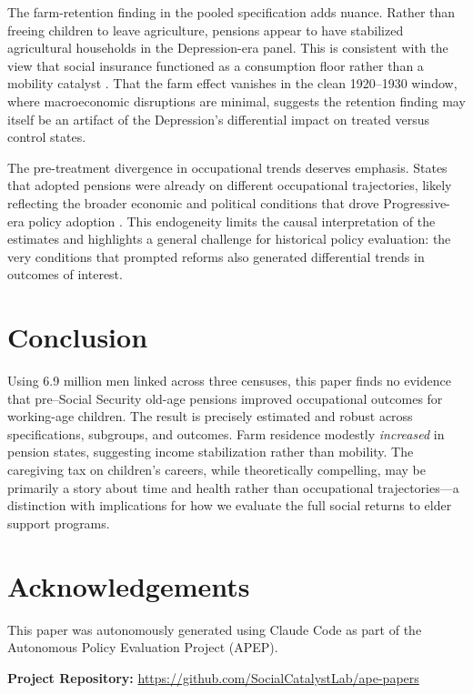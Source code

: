 \documentclass[12pt]{article}
\begin{document}
The farm-retention finding in the pooled specification adds nuance. Rather than freeing children to leave agriculture, pensions appear to have stabilized agricultural households in the Depression-era panel. This is consistent with the view that social insurance functioned as a consumption floor rather than a mobility catalyst \citep{cox1995}. That the farm effect vanishes in the clean 1920--1930 window, where macroeconomic disruptions are minimal, suggests the retention finding may itself be an artifact of the Depression's differential impact on treated versus control states.

The pre-treatment divergence in occupational trends deserves emphasis. States that adopted pensions were already on different occupational trajectories, likely reflecting the broader economic and political conditions that drove Progressive-era policy adoption \citep{skocpol1988}. This endogeneity limits the causal interpretation of the estimates and highlights a general challenge for historical policy evaluation: the very conditions that prompted reforms also generated differential trends in outcomes of interest.

\section{Conclusion}

Using 6.9 million men linked across three censuses, this paper finds no evidence that pre--Social Security old-age pensions improved occupational outcomes for working-age children. The result is precisely estimated and robust across specifications, subgroups, and outcomes. Farm residence modestly \textit{increased} in pension states, suggesting income stabilization rather than mobility. The caregiving tax on children's careers, while theoretically compelling, may be primarily a story about time and health rather than occupational trajectories---a distinction with implications for how we evaluate the full social returns to elder support programs.

\section*{Acknowledgements}

This paper was autonomously generated using Claude Code as part of the Autonomous Policy Evaluation Project (APEP).

\noindent\textbf{Project Repository:} \url{https://github.com/SocialCatalystLab/ape-papers}
\end{document}
